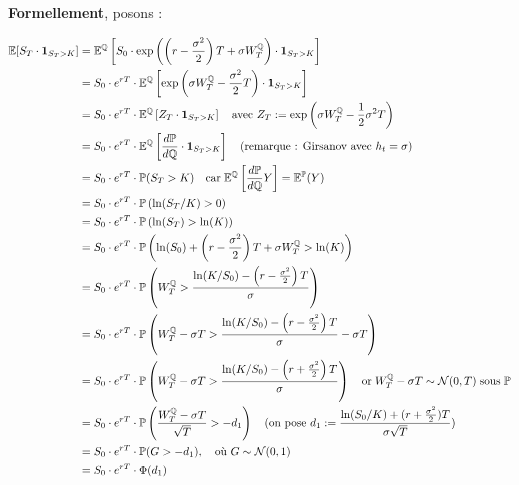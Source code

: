 \textbf{Formellement}, posons :



\begin{align*}
\mathbb{E}[S_T \cdot \mathbf{1}_{S_T > K}] 
&= \mathbb{E}^{\mathbb{Q}}\left[S_0 \cdot \exp\left( \left(r - \frac{\sigma^2}{2}\right)T + \sigma W_T^{\mathbb{Q}} \right) \cdot \mathbf{1}_{S_T > K} \right] \\
&= S_0 \cdot e^{rT} \cdot \mathbb{E}^{\mathbb{Q}}\left[ \exp\left( \sigma W_T^{\mathbb{Q}} - \frac{\sigma^2}{2}T \right) \cdot \mathbf{1}_{S_T > K} \right] \\
&= S_0 \cdot e^{rT} \cdot \mathbb{E}^{\mathbb{Q}}\left[ Z_T \cdot \mathbf{1}_{S_T > K} \right]
\quad \text{avec } Z_T := \exp\left( \sigma W_T^{\mathbb{Q}} - \frac{1}{2}\sigma^2 T \right) \\
&= S_0 \cdot e^{rT} \cdot \mathbb{E}^{\mathbb{Q}}\left[ \frac{d\mathbb{P}}{d\mathbb{Q}} \cdot \mathbf{1}_{S_T > K} \right]
\quad \text{(remarque : Girsanov avec } h_t = \sigma) \\
&= S_0 \cdot e^{rT} \cdot \mathbb{P}(S_T > K) \quad \text{car} \; \mathbb{E}^{\mathbb{Q}}\left[\frac{d\mathbb{P}}{d\mathbb{Q}}Y\right] = \mathbb{E}^{\mathbb{P}}(Y) \\
&= S_0 \cdot e^{rT} \cdot \mathbb{P}\left( \ln(S_T/K) > 0 \right) \\
&= S_0 \cdot e^{rT} \cdot \mathbb{P}\left( \ln(S_T) > \ln(K) \right) \\
&= S_0 \cdot e^{rT} \cdot \mathbb{P}\left( \ln(S_0) + \left(r - \frac{\sigma^2}{2} \right)T + \sigma W_T^{\mathbb{Q}} > \ln(K) \right) \\
&= S_0 \cdot e^{rT} \cdot \mathbb{P}\left( W_T^{\mathbb{Q}} > \frac{ \ln(K/S_0) - \left(r - \frac{\sigma^2}{2} \right)T }{\sigma} \right) \\
&= S_0 \cdot e^{rT} \cdot \mathbb{P}\left( W_T^{\mathbb{Q}} - \sigma T > \frac{ \ln(K/S_0) - \left(r - \frac{\sigma^2}{2} \right)T }{\sigma} - \sigma T \right) \\
&= S_0 \cdot e^{rT} \cdot \mathbb{P}\left( W_T^{\mathbb{Q}} - \sigma T > \frac{ \ln(K/S_0) - \left(r + \frac{\sigma^2}{2} \right)T }{\sigma} \right)  \quad \text{or} \; W_T^{\mathbb{Q}} - \sigma T \sim \mathcal{N}(0,T) \; \text{sous} \; \mathbb{P} \\
&= S_0 \cdot e^{rT} \cdot \mathbb{P}\left( \frac{W_T^{\mathbb{Q}} - \sigma T}{\sqrt{T}} > -d_1 \right)
\quad \text{(on pose \( d_1 := \frac{\ln(S_0/K) + (r + \frac{\sigma^2}{2})T}{\sigma \sqrt{T}} \))} \\
&= S_0 \cdot e^{rT} \cdot \mathbb{P}(G > -d_1), \quad \text{où } G \sim \mathcal{N}(0, 1) \\
&= S_0 \cdot e^{rT} \cdot \Phi(d_1)
\end{align*}


